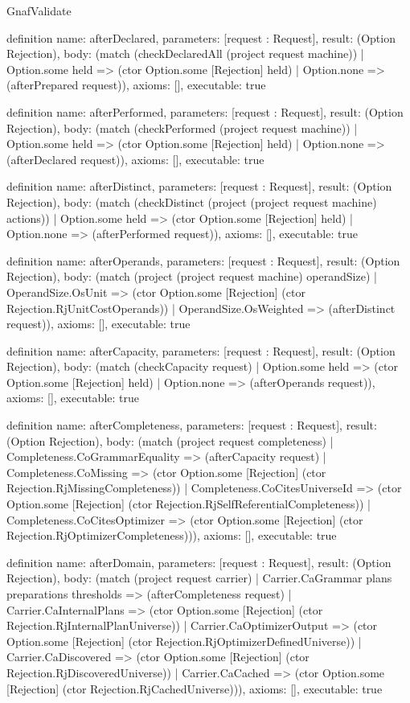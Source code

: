 \begin{lexlean}{GnafValidate}
\begin{semanticmodule}
definition{
  name: afterDeclared,
  parameters: [request : Request],
  result: (Option Rejection),
  body: (match (checkDeclaredAll (project request machine))
    | Option.some held => (ctor Option.some [Rejection] held)
    | Option.none => (afterPrepared request)),
  axioms: [],
  executable: true
}

definition{
  name: afterPerformed,
  parameters: [request : Request],
  result: (Option Rejection),
  body: (match (checkPerformed (project request machine))
    | Option.some held => (ctor Option.some [Rejection] held)
    | Option.none => (afterDeclared request)),
  axioms: [],
  executable: true
}

definition{
  name: afterDistinct,
  parameters: [request : Request],
  result: (Option Rejection),
  body: (match (checkDistinct (project (project request machine) actions))
    | Option.some held => (ctor Option.some [Rejection] held)
    | Option.none => (afterPerformed request)),
  axioms: [],
  executable: true
}

definition{
  name: afterOperands,
  parameters: [request : Request],
  result: (Option Rejection),
  body: (match (project (project request machine) operandSize)
    | OperandSize.OsUnit => (ctor Option.some [Rejection] (ctor Rejection.RjUnitCostOperands))
    | OperandSize.OsWeighted => (afterDistinct request)),
  axioms: [],
  executable: true
}

definition{
  name: afterCapacity,
  parameters: [request : Request],
  result: (Option Rejection),
  body: (match (checkCapacity request)
    | Option.some held => (ctor Option.some [Rejection] held)
    | Option.none => (afterOperands request)),
  axioms: [],
  executable: true
}

definition{
  name: afterCompleteness,
  parameters: [request : Request],
  result: (Option Rejection),
  body: (match (project request completeness)
    | Completeness.CoGrammarEquality => (afterCapacity request)
    | Completeness.CoMissing => (ctor Option.some [Rejection] (ctor Rejection.RjMissingCompleteness))
    | Completeness.CoCitesUniverseId => (ctor Option.some [Rejection] (ctor Rejection.RjSelfReferentialCompleteness))
    | Completeness.CoCitesOptimizer => (ctor Option.some [Rejection] (ctor Rejection.RjOptimizerCompleteness))),
  axioms: [],
  executable: true
}

definition{
  name: afterDomain,
  parameters: [request : Request],
  result: (Option Rejection),
  body: (match (project request carrier)
    | Carrier.CaGrammar plans preparations thresholds => (afterCompleteness request)
    | Carrier.CaInternalPlans => (ctor Option.some [Rejection] (ctor Rejection.RjInternalPlanUniverse))
    | Carrier.CaOptimizerOutput => (ctor Option.some [Rejection] (ctor Rejection.RjOptimizerDefinedUniverse))
    | Carrier.CaDiscovered => (ctor Option.some [Rejection] (ctor Rejection.RjDiscoveredUniverse))
    | Carrier.CaCached => (ctor Option.some [Rejection] (ctor Rejection.RjCachedUniverse))),
  axioms: [],
  executable: true
}


\end{semanticmodule}
\end{lexlean}
